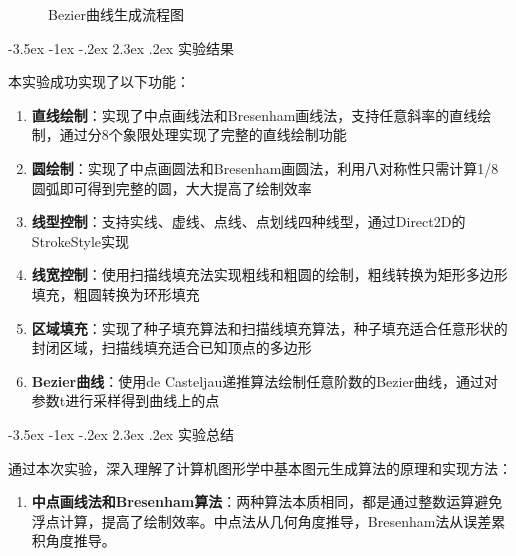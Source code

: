\documentclass[12pt,a4paper]{article}
\makeatletter
\renewcommand\section{\@startsection{section}{1}{\z@}%
    {-3.5ex \@plus -1ex \@minus -.2ex}%
    {2.3ex \@plus.2ex}%
    {\normalfont\Large\bfseries\songti}}
\makeatother
\begin{document}
\begin{tcolorbox}
\begin{figure}[H]
\caption{Bezier曲线生成流程图}
\label{fig:bezier_generate}
\end{figure}
\end{tcolorbox}
\clearpage

\begin{tcolorbox}
\section{实验结果}


本实验成功实现了以下功能：

\begin{enumerate}
    \item \textbf{直线绘制}：实现了中点画线法和Bresenham画线法，支持任意斜率的直线绘制，通过分8个象限处理实现了完整的直线绘制功能
    \item \textbf{圆绘制}：实现了中点画圆法和Bresenham画圆法，利用八对称性只需计算1/8圆弧即可得到完整的圆，大大提高了绘制效率
    \item \textbf{线型控制}：支持实线、虚线、点线、点划线四种线型，通过Direct2D的StrokeStyle实现
    \item \textbf{线宽控制}：使用扫描线填充法实现粗线和粗圆的绘制，粗线转换为矩形多边形填充，粗圆转换为环形填充
    \item \textbf{区域填充}：实现了种子填充算法和扫描线填充算法，种子填充适合任意形状的封闭区域，扫描线填充适合已知顶点的多边形
    \item \textbf{Bezier曲线}：使用de Casteljau递推算法绘制任意阶数的Bezier曲线，通过对参数t进行采样得到曲线上的点
\end{enumerate}

\section{实验总结}


通过本次实验，深入理解了计算机图形学中基本图元生成算法的原理和实现方法：

\begin{enumerate}
    \item \textbf{中点画线法和Bresenham算法}：两种算法本质相同，都是通过整数运算避免浮点计算，提高了绘制效率。中点法从几何角度推导，Bresenham法从误差累积角度推导。
    

\end{enumerate}
\end{tcolorbox}
\end{document}
